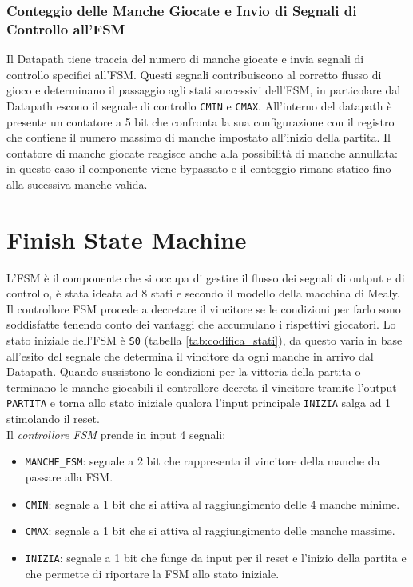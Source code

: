 \documentclass[a4paper]{report}
\begin{document}
\subsubsection{Conteggio delle Manche Giocate e Invio di Segnali di Controllo all'FSM}
Il Datapath tiene traccia del numero di manche giocate e invia segnali di controllo specifici all'FSM.
Questi segnali contribuiscono al corretto flusso di gioco e determinano il passaggio agli stati successivi dell'FSM, in particolare dal Datapath escono il segnale di controllo \texttt{CMIN} e \texttt{CMAX}.
All'interno del datapath è presente un contatore a 5 bit che confronta la sua configurazione con il registro che contiene il numero massimo di manche impostato all'inizio della partita.
Il contatore di manche giocate reagisce anche alla possibilità di manche annullata: in questo caso il componente viene bypassato e il conteggio rimane statico fino alla sucessiva manche valida.

\section{Finish State Machine}

L'FSM è il componente che si occupa di gestire il flusso dei segnali di output e di controllo, è stata ideata ad 8 stati e secondo il modello della macchina di Mealy.
Il controllore FSM procede a decretare il vincitore se le condizioni per farlo sono soddisfatte tenendo conto dei vantaggi che accumulano i rispettivi giocatori.
Lo stato iniziale dell'FSM è \texttt{S0} (tabella \ref{tab:codifica_stati}), da questo varia in base all'esito del segnale che determina il vincitore da ogni manche in arrivo dal Datapath.
Quando sussistono le condizioni per la vittoria della partita o terminano le manche giocabili il controllore decreta il vincitore tramite l'output \texttt{PARTITA} e torna allo stato iniziale qualora l'input principale \texttt{INIZIA} salga ad 1 stimolando il reset.
\\
Il \textit{controllore FSM} prende in input 4 segnali:
\begin{itemize}
    \item \texttt{MANCHE\_FSM}: segnale a 2 bit che rappresenta il vincitore della manche da passare alla FSM.
    \item \texttt{CMIN}: segnale a 1 bit che si attiva al raggiungimento delle 4 manche minime.
    \item \texttt{CMAX}: segnale a 1 bit che si attiva al raggiungimento delle manche massime.
    \item \texttt{INIZIA}: segnale a 1 bit che funge da input per il reset e l'inizio della partita e che permette di riportare la FSM allo stato iniziale.
\end{itemize}
\end{document}
